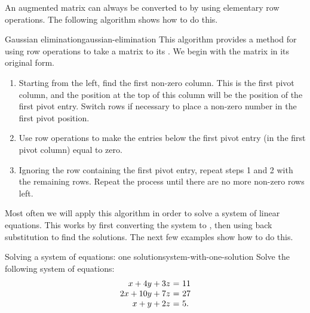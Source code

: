 An augmented matrix can always be converted to {\ef} by using
elementary row operations. The following algorithm shows how to do
this.

\begin{algorithm}{Gaussian elimination}{gaussian-elimination}
  This algorithm provides a method for using row operations to take a
  matrix to its {\ef} .
  We begin with the matrix in its original form.

  \begin{enumerate}
  \item Starting from the left, find the first non-zero column. This is
    the first pivot column, and the position at the top of this column
    will be the position of the first pivot entry. Switch rows if
    necessary to place a non-zero number in the first pivot position.

  \item Use row operations to make the entries below the first pivot
    entry (in the first pivot column) equal to zero.

  \item Ignoring the row containing the first pivot entry, repeat
    steps 1 and 2 with the remaining rows.  Repeat the process until
    there are no more non-zero rows left.

  \end{enumerate}
\end{algorithm}

Most often we will apply this algorithm in order to solve a system of
linear equations. This works by first converting the system to {\ef},
then using back substitution to find the solutions. The next few
examples show how to do this.

\begin{example}{Solving a system of equations: one solution}{system-with-one-solution}
  Solve the following system of equations:
  \begin{equation*}
    \begin{array}{r@{~}c@{~}l}
      x + 4y + 3z &=& 11 \\
      2x + 10y + 7z &=& 27 \\
      x + y + 2z &=& 5.
    \end{array}
  \end{equation*}
\end{example}

